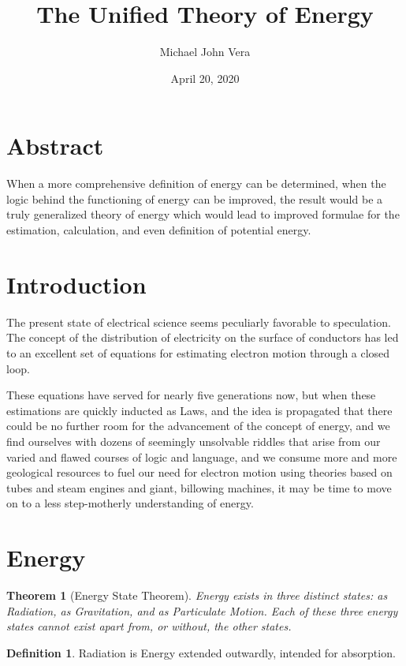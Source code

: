 \documentclass[12pt]{article}
\title{The Unified Theory of Energy}
\author{Michael John Vera}
\date{April 20, 2020}
\theoremstyle{plain}
\newtheorem{theorem}{Theorem}
\theoremstyle{definition}
\newtheorem{definition}{Definition}
\begin{document}
\maketitle

\section*{Abstract}
When a more comprehensive definition of energy can be determined, when the logic behind the functioning of energy can be improved, the result would be a truly generalized theory of energy which would lead to improved formulae for the estimation, calculation, and even definition of potential energy.

\section*{Introduction}
The present state of electrical science seems peculiarly favorable to speculation. The concept of the distribution of electricity on the surface of conductors has led to an excellent set of equations for estimating electron motion through a closed loop.

These equations have served for nearly five generations now, but when these estimations are quickly inducted as Laws, and the idea is propagated that there could be no further room for the advancement of the concept of energy, and we find ourselves with dozens of seemingly unsolvable riddles that arise from our varied and flawed courses of logic and language, and we consume more and more geological resources to fuel our need for electron motion using theories based on tubes and steam engines and giant, billowing machines, it may be time to move on to a less step-motherly understanding of energy.

\section*{Energy}

\begin{theorem}[Energy State Theorem]
Energy exists in three distinct states: as Radiation, as Gravitation, and as Particulate Motion. Each of these three energy states cannot exist apart from, or without, the other states.
\end{theorem}

\begin{definition}
Radiation is Energy extended outwardly, intended for absorption.
\end{definition}
\end{document}
